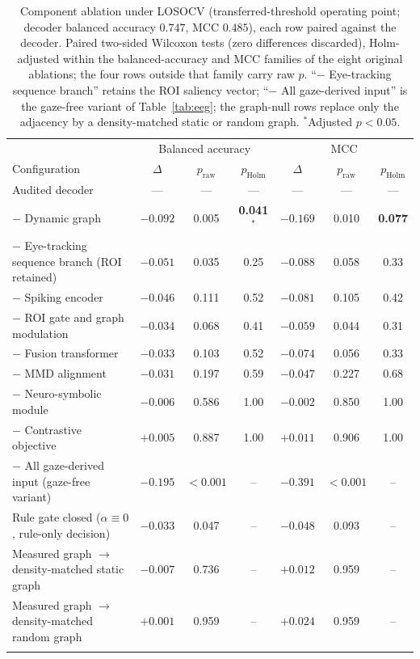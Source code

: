 \begin{table}[!htbp]
\caption{Component ablation under LOSOCV (transferred-threshold operating point; decoder balanced accuracy $0.747$, MCC $0.485$), each row paired against the decoder. Paired two-sided Wilcoxon tests (zero differences discarded), Holm-adjusted within the balanced-accuracy and MCC families of the eight original ablations; the four rows outside that family carry raw $p$. ``$-$ Eye-tracking sequence branch'' retains the ROI saliency vector; ``$-$ All gaze-derived input'' is the gaze-free variant of Table~\ref{tab:eeg}; the graph-null rows replace only the adjacency by a density-matched static or random graph. $^{*}$Adjusted $p<0.05$.}\label{tab:abl}
\small
\begin{tabular*}{\linewidth}{@{\extracolsep{\fill}}lcccccc@{}}
\toprule
& \multicolumn{3}{c}{Balanced accuracy} & \multicolumn{3}{c}{MCC} \\
Configuration & $\Delta$ & $p_{\mathrm{raw}}$ & $p_{\mathrm{Holm}}$ & $\Delta$ & $p_{\mathrm{raw}}$ & $p_{\mathrm{Holm}}$ \\
\midrule
Audited decoder & --- & --- & --- & --- & --- & --- \\
$-$ Dynamic graph & $-0.092$ & 0.005 & \textbf{0.041}$^{*}$ & $-0.169$ & 0.010 & \textbf{0.077} \\
$-$ Eye-tracking sequence branch (ROI retained) & $-0.051$ & 0.035 & 0.25 & $-0.088$ & 0.058 & 0.33 \\
$-$ Spiking encoder & $-0.046$ & 0.111 & 0.52 & $-0.081$ & 0.105 & 0.42 \\
$-$ ROI gate and graph modulation & $-0.034$ & 0.068 & 0.41 & $-0.059$ & 0.044 & 0.31 \\
$-$ Fusion transformer & $-0.033$ & 0.103 & 0.52 & $-0.074$ & 0.056 & 0.33 \\
$-$ MMD alignment & $-0.031$ & 0.197 & 0.59 & $-0.047$ & 0.227 & 0.68 \\
$-$ Neuro-symbolic module & $-0.006$ & 0.586 & 1.00 & $-0.002$ & 0.850 & 1.00 \\
$-$ Contrastive objective & $+0.005$ & 0.887 & 1.00 & $+0.011$ & 0.906 & 1.00 \\
\midrule
$-$ All gaze-derived input (gaze-free variant) & $-0.195$ & $<0.001$ & -- & $-0.391$ & $<0.001$ & -- \\
Rule gate closed ($\alpha\equiv0$, rule-only decision) & $-0.033$ & 0.047 & -- & $-0.048$ & 0.093 & -- \\
Measured graph $\to$ density-matched static graph & $-0.007$ & 0.736 & -- & $+0.012$ & 0.959 & -- \\
Measured graph $\to$ density-matched random graph & $+0.001$ & 0.959 & -- & $+0.024$ & 0.959 & -- \\
\botrule
\end{tabular*}
\end{table}

